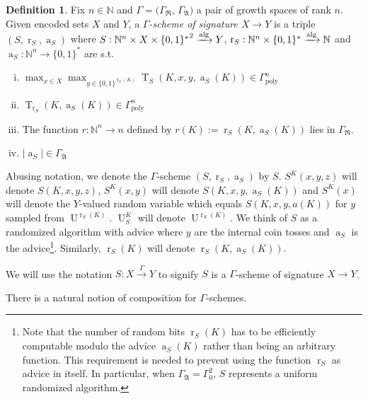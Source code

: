 \documentclass{article}
\numberwithin{equation}{section}
\theoremstyle{definition}
\newtheorem{definition}{Definition}[section]
\theoremstyle{plain}
\newcommand{\Bool}{\{0,1\}}
\newcommand{\Words}{{\Bool^*}}
\DeclareMathOperator{\T}{T}
\DeclareMathOperator{\R}{r}
\DeclareMathOperator{\A}{a}
\DeclareMathOperator{\Un}{U}
\newcommand{\Nats}{\mathbb{N}}
\newcommand{\Abs}[1]{\lvert #1 \rvert}
\newcommand{\GrowR}{\Gamma_{\mathfrak{R}}}
\newcommand{\GrowA}{\Gamma_{\mathfrak{A}}}
\newcommand{\BoolR}[1]{\Bool^{\R_{#1}(K)}}
\newcommand{\Alg}{\xrightarrow{\textnormal{alg}}}
\newcommand{\Scheme}{\xrightarrow{\Gamma}}
\begin{document}
\begin{samepage}
\begin{definition}

Fix $n \in \Nats$ and $\Gamma=(\GrowR$, $\GrowA)$ a pair of growth spaces of rank $n$. Given encoded sets $X$ and $Y$, a \emph{$\Gamma$-scheme of signature $X \rightarrow Y$} is a triple $(S,\R_S,\A_S)$ where ${S: \Nats^n \times X \times \Words^2 \Alg Y}$, $\R_S: \Nats^n \times \Words \Alg \Nats$ and $\A_S: \Nats^n \rightarrow \Words$ are s.t.

\begin{enumerate}[(i)]

\item $\max_{x \in X} \max_{y \in \BoolR{S}} \T_S(K,x,y,\A_S(K)) \in \Gamma_{\text{poly}}^n$

\item $\T_{\R_S}(K,\A_S(K)) \in \Gamma_{\text{poly}}^n$

\item The function $r: \Nats^n \rightarrow n$ defined by $r(K):=\R_S(K,\A_S(K))$ lies in $\GrowR$.

\item $\Abs{\A_S} \in \GrowA$

\end{enumerate}

Abusing notation, we denote the $\Gamma$-scheme $(S,\R_S,\A_S)$ by $S$. $S^K(x,y,z)$ will denote $S(K,x,y,z)$, $S^K(x,y)$ will denote $S(K,x,y,\A_S(K))$ and $S^K(x)$ will denote the $Y$-valued random variable which equals $S(K,x,y,a(K))$ for $y$ sampled from $\Un^{\R_S(K)}$. $\Un_S^K$ will denote $\Un^{\R_S(K)}$. We think of $S$ as a randomized algorithm with advice where $y$ are the internal coin tosses and $\A_S$ is the advice\footnote{Note that the number of random bits $\R_S(K)$ has to be efficiently computable modulo the advice $\A_S(K)$ rather than being an arbitrary function. This requirement is needed to prevent using the function $\R_S$ as advice in itself. In particular, when $\GrowA=\Gamma_0^2$, $S$ represents a uniform randomized algorithm.}. Similarly, $\R_S(K)$ will denote $\R_S(K,\A_S(K))$.

We will use the notation $S: X \Scheme Y$ to signify $S$ is a $\Gamma$-scheme of signature $X \rightarrow Y$.

\end{definition}
\end{samepage}

There is a natural notion of composition for $\Gamma$-schemes.
\end{document}
